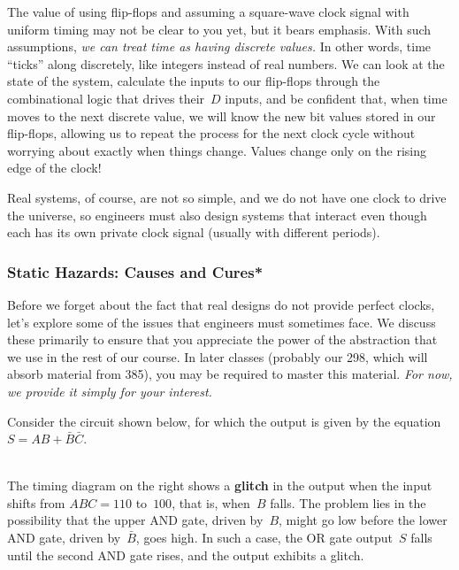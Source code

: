 The value of using flip-flops and assuming a square-wave
clock signal with uniform timing may not be clear to you yet,
but it bears emphasis.
%
With such assumptions, {\em we can treat time as having 
discrete values.}  In other words, time ``ticks'' along discretely,
like integers instead of real numbers.
%
We can look at the state of the system, calculate the inputs to our
flip-flops through the combinational logic that drives their~$D$
inputs, and be confident that, when time moves to the next discrete
value, we will know the new bit values stored in our flip-flops,
allowing us to repeat the process for the next clock cycle without
worrying about exactly when things change.  Values change only
on the rising edge of the clock!

Real systems, of course, are not so simple, and we do not have one
clock to drive the universe, so engineers must also design systems
that interact even though each has its own private clock signal
(usually with different periods).\\

\pagebreak

\subsubsection{Static Hazards: Causes and Cures*}

Before we forget about the fact that real designs do not provide
perfect clocks, let's explore some of the issues that engineers
must sometimes face.  
%
We discuss these primarily to ensure that you appreciate the power
of the abstraction that we use in the rest of our course.
In later classes (probably our 298, which will absorb material 
from 385), you may be required to master this material.
{\em For now, we provide it simply for your interest.}

Consider the circuit shown below, for which the output is given by 
the equation $S=AB+\bar{B}\bar{C}$.\\ \\

\centerline{}\vspace{12pt}

The timing diagram on the right shows a {\bf glitch} in the output
when the input shifts from $ABC=110$ to~$100$, that is, when~$B$ falls.
The problem lies in the possibility that the upper AND gate, driven 
by~$B$, might go low before the lower AND gate, driven by~$\bar{B}$, goes
high.  In such a case, the OR gate output~$S$ falls until the second
AND gate rises, and the output exhibits a glitch.

